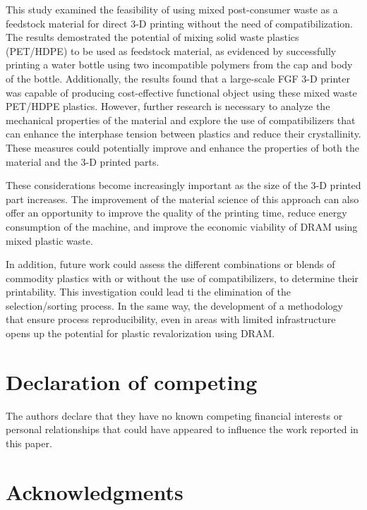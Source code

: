 \documentclass[
]{article}
\begin{document}
This study examined the feasibility of using mixed post-consumer waste
as a feedstock material for direct 3-D printing without the need of
compatibilization. The results demostrated the potential of mixing solid
waste plastics (PET/HDPE) to be used as feedstock material, as evidenced
by successfully printing a water bottle using two incompatible polymers
from the cap and body of the bottle. Additionally, the results found
that a large-scale FGF 3-D printer was capable of producing
cost-effective functional object using these mixed waste PET/HDPE
plastics. However, further research is necessary to analyze the
mechanical properties of the material and explore the use of
compatibilizers that can enhance the interphase tension between plastics
and reduce their crystallinity. These measures could potentially improve
and enhance the properties of both the material and the 3-D printed
parts.

These considerations become increasingly important as the size of the
3-D printed part increases. The improvement of the material science of
this approach can also offer an opportunity to improve the quality of
the printing time, reduce energy consumption of the machine, and improve
the economic viability of DRAM using mixed plastic waste.

In addition, future work could assess the different combinations or
blends of commodity plastics with or without the use of compatibilizers,
to determine their printability. This investigation could lead ti the
elimination of the selection/sorting process. In the same way, the
development of a methodology that ensure process reproducibility, even
in areas with limited infrastructure opens up the potential for plastic
revalorization using DRAM.

\hypertarget{declaration-of-competing}{%
\section*{Declaration of competing}\label{declaration-of-competing}}

The authors declare that they have no known competing financial
interests or personal relationships that could have appeared to
influence the work reported in this paper.

\hypertarget{acknowledgments}{%
\section*{Acknowledgments}\label{acknowledgments}}
\end{document}
